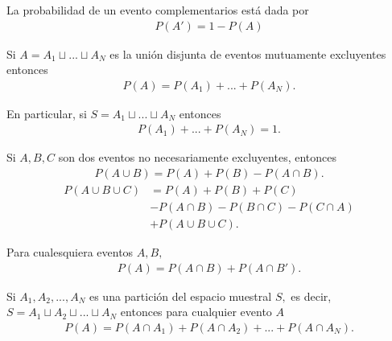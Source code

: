 {}
\begin{thm}
 \label{thm:0.1.4} La probabilidad de un evento complementarios está dada por
 \begin{align}
 \label{eq:0.1.7}
   P(A')=1-P(A)
  \end{align}
\end{thm}


{}
\begin{thm}
 \label{thm:0.1.5} Si $A=A_{1}\sqcup...\sqcup A_{N}$ es la unión disjunta de eventos mutuamente excluyentes entonces
 \begin{align}
 \label{eq:0.1.8}
P(A)=P(A_{1})+...+P(A_{N}).
\end{align}


En particular, si $S=A_{1}\sqcup...\sqcup A_{N}$ entonces
 \begin{align}
 \label{eq:0.1.9}
P(A_{1})+...+P(A_{N})=1.
\end{align}
\end{thm}


{}
\begin{thm}
 \label{thm:0.1.6}
  Si $A,B,C$ son dos eventos no necesariamente excluyentes, entonces
 \begin{align}
   \label{eq:0.1.10}
   P(A\cup B)=P(A)+P(B)-P(A\cap B).
 \end{align}
 \begin{align}
 \label{eq:0.1.11}
	P(A\cup B \cup C)&=P(A)+P(B)+P(C)\\
	&-P(A\cap B)-P(B\cap C)-P(C\cap A)\\
	&+P(A\cup B \cup C).
\end{align}
\end{thm}



{}
\begin{thm}
\label{thm:0.1.7}
 Para cualesquiera eventos $A,B,$
\begin{align}
 \label{eq:0.1.12}
 P(A)=P(A\cap B)+P(A\cap B').
\end{align}
\end{thm}


{}
\begin{thm}
 \label{thm:0.1.8}
 Si $A_{1},A_{2},..., A_{N}$ es una partición del espacio muestral $S,$ es decir,
 $S=A_{1} \sqcup A_{2} \sqcup ... \sqcup A_{N}$ entonces para cualquier evento $A$
 \begin{align}
  \label{eq:0.1.13}
  P(A)=P(A\cap A_{1})+ P(A\cap A_{2}) + ... +P(A\cap A_{N}).
 \end{align}
\end{thm}


